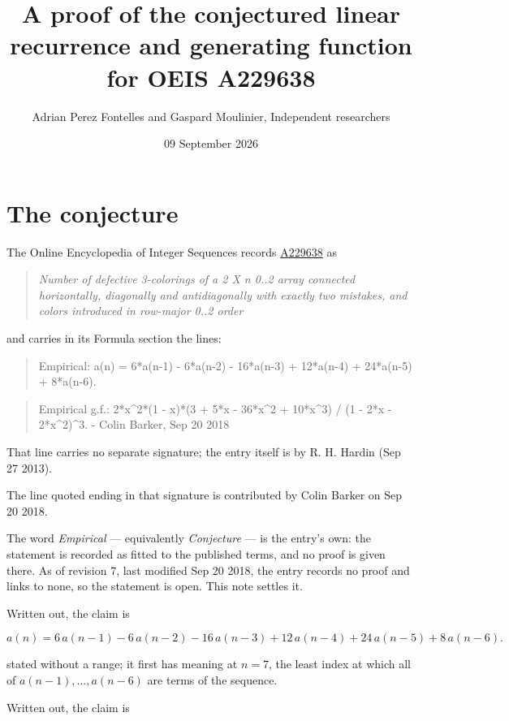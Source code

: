 \documentclass[11pt]{article}
\title{A proof of the conjectured linear recurrence and generating function for OEIS A229638}
\author{Adrian Perez Fontelles and Gaspard Moulinier, Independent researchers}
\date{09 September 2026}
\theoremstyle{definition}
\begin{document}
\maketitle
\section{The conjecture}

The Online Encyclopedia of Integer Sequences records \href{https://oeis.org/A229638}{A229638} as

\begin{quote}\itshape Number of defective 3-colorings of a 2 X n 0..2 array connected horizontally, diagonally and antidiagonally with exactly two mistakes, and colors introduced in row-major 0..2 order\end{quote}

and carries in its Formula section the lines:

\begin{quote}\ttfamily Empirical: a(n) = 6*a(n-1) - 6*a(n-2) - 16*a(n-3) + 12*a(n-4) + 24*a(n-5) + 8*a(n-6).\end{quote}

\begin{quote}\ttfamily Empirical g.f.: 2*x\textasciicircum{}2*(1 - x)*(3 + 5*x - 36*x\textasciicircum{}2 + 10*x\textasciicircum{}3) / (1 - 2*x - 2*x\textasciicircum{}2)\textasciicircum{}3. - Colin Barker, Sep 20 2018\end{quote}

That line carries no separate signature; the entry itself is by R. H. Hardin (Sep 27 2013).

The line quoted ending in that signature is contributed by Colin Barker on Sep 20 2018.

The word {\itshape Empirical} --- equivalently {\itshape Conjecture} --- is the entry's own: the statement is recorded as fitted to the published terms, and no proof is given there. As of revision 7, last modified Sep 20 2018, the entry records no proof and links to none, so the statement is open. This note settles it.

Written out, the claim is

\[a(n) = 6\,a(n-1) - 6\,a(n-2) - 16\,a(n-3) + 12\,a(n-4) + 24\,a(n-5) + 8\,a(n-6).\]

stated without a range; it first has meaning at $n = 7$, the least index at which all of $a(n-1),\dots,a(n-6)$ are terms of the sequence.

Written out, the claim is
\end{document}

